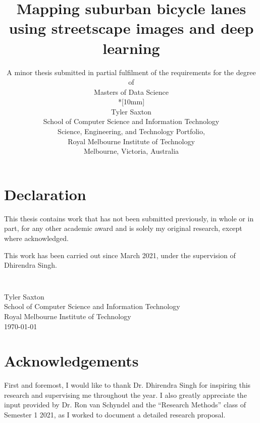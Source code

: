 \documentclass[11pt,twoside]{report}
\newcommand{\SubmissionDate}{\today}
\newcommand{\student}{Tyler Saxton}
\newcommand{\supervisor}{Dhirendra Singh}
\newcommand{\topic}{Mapping suburban bicycle lanes using streetscape images and deep learning}
\newcommand{\school}{School of Computer Science and Information Technology}
\newcommand{\program}{Masters of Data Science}
\newcommand{\institution}{Royal Melbourne Institute of Technology}
\begin{document}
\title{{\Large\bf \topic}}
\author{
A minor thesis submitted in partial fulfilment of the requirements for the degree of
\\\program\\*[10mm]
\\\student
\\\school
\\Science, Engineering, and Technology Portfolio,
\\\institution
\\Melbourne, Victoria, Australia
}
\maketitle
\thispagestyle{empty}


\chapter*{Declaration}

This thesis contains work that has not been submitted previously, in
whole or in part, for any other academic award and is solely my
original research, except where acknowledged.

This work has been carried out since March 2021, under the
supervision of {\supervisor}.

\paragraph{}
\vspace{5cm}\noindent \\\student \\
\school\\
\institution\\
\SubmissionDate


\chapter*{Acknowledgements}

First and foremost, I would like to thank Dr. Dhirendra Singh for inspiring this research and supervising me throughout the year.  I also greatly appreciate the input provided by Dr. Ron van Schyndel and the ``Research Methods'' class of Semester 1 2021, as I worked to document a detailed research proposal. \\
\end{document}
